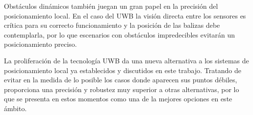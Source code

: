Obstáculos dinámicos también juegan un gran papel en la precisión del posicionamiento local.
En el caso del UWB la visión directa entre los sensores es crítica para su correcto funcionamiento y la posición de las balizas debe contemplarla, por lo que escenarios con obstáculos impredecibles evitarán un posicionamiento preciso.

La proliferación de la tecnología UWB da una nueva alternativa a los sistemas de posicionamiento local ya establecidos y discutidos en este trabajo.
Tratando de evitar en la medida de lo posible los casos donde aparecen sus puntos débiles, proporciona una precisión y robustez muy superior a otras alternativas, por lo que se presenta en estos momentos como una de la mejores opciones en este ámbito.